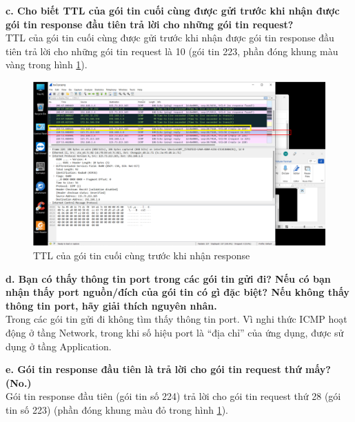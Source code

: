 \textbf{c.	Cho biết TTL của gói tin cuối cùng được gửi trước khi nhận được gói tin response đầu tiên trả lời cho những gói tin request?}\\
TTL của gói tin cuối cùng được gửi trước khi nhận được gói tin response đầu tiên trả lời cho những gói tin request là 10 (gói tin 223, phần đóng khung màu vàng trong hình \ref{fig352}).
\begin{figure}[H]
\begin{center}
\includegraphics[scale=.8]{../figures/p3/p3_52}
\end{center}
\caption{TTL của gói tin cuối cùng trước khi nhận response}
\label{fig352}
\end{figure}

\textbf{d.	Bạn có thấy thông tin port trong các gói tin gửi đi? Nếu có bạn nhận thấy port nguồn/đích của gói tin có gì đặc biệt? Nếu không thấy thông tin port, hãy giải thích nguyên nhân.}\\
Trong các gói tin gửi đi không tìm thấy thông tin port. Vì nghi thức ICMP hoạt động ở tầng Network, trong khi số hiệu port là “địa chỉ” của ứng dụng, được sử dụng ở tầng Application.

\textbf{e.	Gói tin response đầu tiên là trả lời cho gói tin request thứ mấy? (No.)}\\
Gói tin response đầu tiên (gói tin số 224) trả lời cho gói tin request thứ 28 (gói tin số 223) (phần đóng khung màu đỏ trong hình \ref{fig352}).